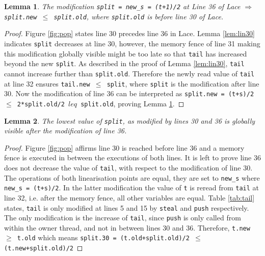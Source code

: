 \documentclass{sig-alternate-br}
\newtheorem{lemma}{Lemma}
\begin{document}
\begin{lemma}
	The modification \texttt{split = new\_s = (t+1)/2} at Line 36 of Lace $\Rightarrow$ \texttt{split.new $\leq$ split.old}, where \texttt{split.old} is before line 30 of Lace.
	\label{lem:lin36}
\end{lemma}
\begin{proof}
	Figure \ref{fig:pop} states line 30 precedes line 36 in Lace.
	Lemma \ref{lem:lin30} indicates \texttt{split} decreases at line 30, however, the memory fence of line 31 making this modification globally visible might be too late so that \texttt{tail} has increased beyond the new \texttt{split}.
	As described in the proof of Lemma \ref{lem:lin30}, \texttt{tail} cannot increase further than \texttt{split.old}.
	Therefore the newly read value of \texttt{tail} at line 32 ensures \texttt{tail.new $\leq$ split}, where \texttt{split} is the modification after line 30.
	Now the modification of line 36 can be interpreted as \texttt{split.new = (t+s)/2 $\leq$ 2*split.old/2 $leq$ split.old}, proving Lemma \ref{lem:lin36}.
\end{proof}

\begin{lemma}
	The lowest value of \texttt{split}, as modified by lines 30 and 36 is globally visible after the modification of line 36.
	\label{lem:lin3036}
\end{lemma}
\begin{proof}	
	Figure \ref{fig:pop} affirms line 30 is reached before line 36 and a memory fence is executed in between the executions of both lines.
	It is left to prove line 36 does not decrease the value of \texttt{tail}, with respect to the modification of line 30.
	The operations of both linearisation points are equal, they are set to \texttt{new\_s} where \texttt{new\_s = (t+s)/2}.
	In the latter modification the value of \texttt{t} is reread from \texttt{tail} at line 32, i.e. after the memory fence, all other variables are equal.
	Table \ref{tab:tail} states, \texttt{tail} is only modified at lines 5 and 15 by \texttt{steal} and \texttt{push} respectively.
	The only modification is the increase of \texttt{tail}, since \texttt{push} is only called from within the owner thread, and not in between lines 30 and 36.
	Therefore, \texttt{t.new $\geq$ t.old} which means \texttt{split.30 = (t.old+split.old)/2 $\leq$ (t.new+split.old)/2}	
\end{proof}
\end{document}
